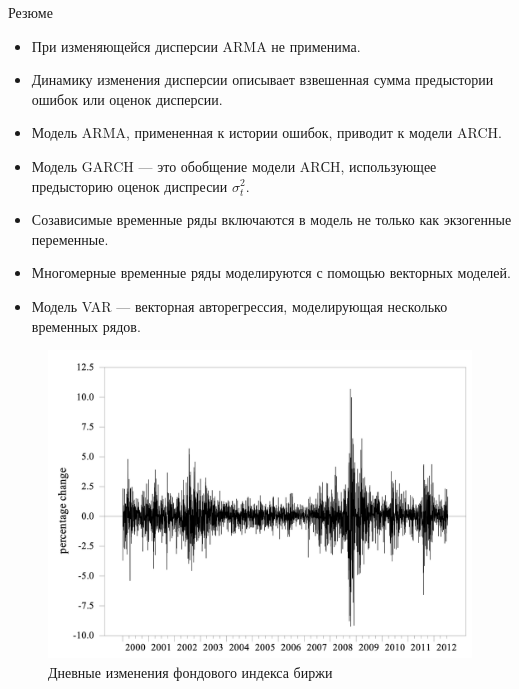 \begin{frame}{Резюме}
    \begin{itemize}
        \item При изменяющейся дисперсии ARMA не применима.
        \item Динамику изменения дисперсии описывает взвешенная сумма предыстории ошибок или оценок дисперсии.
        \item Модель ARMA, примененная к истории ошибок, приводит к модели ARCH.
        \item Модель GARCH --- это обобщение модели ARСH, использующее предысторию оценок диспресии $\sigma_t^2$.
        \item Созависимые временные ряды включаются в модель не только как экзогенные переменные.
        \item Многомерные временные ряды моделируются с помощью векторных моделей.
        \item Модель VAR --- векторная авторегрессия, моделирующая несколько временных рядов.
        
    \end{itemize}
\end{frame}
\begin{figure}
    \centering
    \includegraphics[width=0.9\linewidth]{lecture_3/fig/index_USA.png}
    \caption{Дневные изменения фондового индекса биржи}
\end{figure}
 